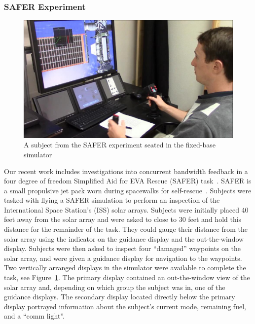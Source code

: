 \documentclass[float=false, crop=false]{standalone}
\begin{document}
\subsubsection{SAFER Experiment}
\begin{figure}[tb]
    \begin{center}
        \includegraphics[width=0.8\linewidth]{./../img/SAFER_DangerChris.jpg}
        \caption{A subject from the SAFER experiment seated in the fixed-base simulator~\cite{Karasinski2016Masters}}
        \label{figure:safersim}
    \end{center}
\end{figure}

Our recent work includes investigations into concurrent bandwidth feedback in a four degree of freedom Simplified Aid for EVA Rescue (SAFER) task~\cite{Karasinski2016Masters, Karasinski2017, Karasinski2016}.
SAFER is a small propulsive jet pack worn during spacewalks for self-rescue~\cite{Vassigh1998}.
Subjects were tasked with flying a SAFER simulation to perform an inspection of the International Space Station's (ISS) solar arrays.
Subjects were initially placed 40 feet away from the solar array and were asked to close to 30 feet and hold this distance for the remainder of the task.
They could gauge their distance from the solar array using the indicator on the guidance display and the out-the-window display.
Subjects were then asked to inspect four ``damaged'' waypoints on the solar array, and were given a guidance display for navigation to the waypoints. %
Two vertically arranged displays in the simulator were available to complete the task, see Figure~\ref{figure:safersim}.
The primary display contained an out-the-window view of the solar array and, depending on which group the subject was in, one of the guidance displays. %
The secondary display located directly below the primary display portrayed information about the subject's current mode, remaining fuel, and a ``comm light''.
\end{document}
